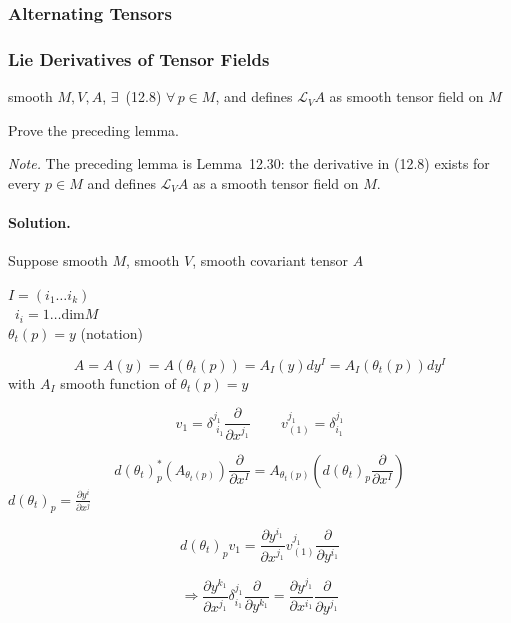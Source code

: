 \subsubsection*{Alternating Tensors}





\subsubsection*{Lie Derivatives of Tensor Fields}



\begin{lemma}[12.30] smooth $M,V,A$, $\exists \, $ (12.8) $\forall \, p \in M$, and defines $\mathcal{L}_VA$ as smooth tensor field on $M$
\end{lemma}

\begin{exercise}
Prove the preceding lemma.
\end{exercise}
\noindent\emph{Note.} The preceding lemma is Lemma~12.30: the derivative in (12.8) exists for every $p\in M$ and defines $\mathcal{L}_VA$ as a smooth tensor field on $M$.
\paragraph{Solution.}

Suppose smooth $M$, smooth $V$, smooth covariant tensor $A$

$I = (i_1 \dots i_k)$ \\
\quad \, $i_i = 1 \dots \text{dim}{M}$ \\

$\theta_t(p) = y$ (notation) 

\[
A = A(y) = A(\theta_t(p)) = A_I(y) dy^I = A_I(\theta_t(p)) dy^I
\]
with $A_I$ smooth function of $\theta_t(p) = y$


\[
v_1 = \delta^{j_1}_{ \, \, i_1} \frac{ \partial }{ \partial x^{j_1}} \quad \quad \, v^{j_1}_{ (1)} = \delta^{j_1}_{ i_1}
\]


\[
d(\theta_t)^*_p(A_{\theta_t(p)}) \frac{ \partial }{ \partial x^I} = A_{\theta_t(p)}(d(\theta_t)_p \frac{ \partial }{ \partial x^I } )
\]
$d(\theta_t)_p = \frac{ \partial y^i}{ \partial x^j}$

\[
d(\theta_t)_p v_1  = \frac{ \partial y^{i_1}}{ \partial x^{j_1}} v^{j_1}_{(1)} \frac{ \partial }{ \partial y^{i_1}}
\]


\[
\Longrightarrow \frac{ \partial y^{k_1} }{ \partial x^{j_1} } \delta^{j_1}_{i_1} \frac{ \partial }{ \partial y^{k_1}} = \frac{ \partial y^{j_1}}{ \partial x^{i_1}} \frac{ \partial }{ \partial y^{j_1}} 
\]


